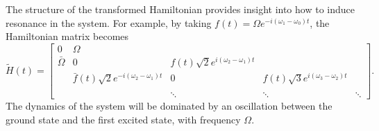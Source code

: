 \documentclass[11pt]{article}
\begin{document}
The structure of the transformed Hamiltonian provides insight into how to induce resonance in the
system. For example, by taking $f(t)=\Omega e^{-i(\omega_1 - \omega_0)t}$, the Hamiltonian matrix becomes
\[
\tilde{H}(t) = \begin{bmatrix}
0 & \Omega & & &\\
\bar{\Omega} & 0 & f(t) \sqrt{2} e^{i(\omega_2 -\omega_1) t}& &\\
& \bar{f}(t) \sqrt{2} e^{-i(\omega_2 -\omega_1) t} & 0 & f(t) \sqrt{3} e^{i(\omega_3 -\omega_2)t}
&\\
\\
& & \ddots & \ddots & \ddots
\end{bmatrix}.
\]
The dynamics of the system will be dominated by an oscillation between the ground state and the
first excited state, with frequency $\Omega$.
\end{document}
